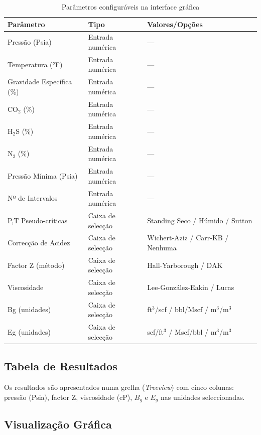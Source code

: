 \documentclass[12pt, a4paper]{article}
\begin{document}
\begin{table}[H]
  \centering
  \caption{Parâmetros configuráveis na interface gráfica}
  \begin{tabular}{@{}lll@{}}
    \toprule
    \textbf{Parâmetro} & \textbf{Tipo} & \textbf{Valores/Opções} \\
    \midrule
    Pressão (Psia)        & Entrada numérica  & — \\
    Temperatura (°F)      & Entrada numérica  & — \\
    Gravidade Específica (\%) & Entrada numérica & — \\
    CO$_2$ (\%)           & Entrada numérica  & — \\
    H$_2$S (\%)           & Entrada numérica  & — \\
    N$_2$ (\%)            & Entrada numérica  & — \\
    Pressão Mínima (Psia) & Entrada numérica  & — \\
    Nº de Intervalos      & Entrada numérica  & — \\
    P,T Pseudo-críticas   & Caixa de selecção & Standing Seco / Húmido / Sutton \\
    Correcção de Acidez   & Caixa de selecção & Wichert-Aziz / Carr-KB / Nenhuma \\
    Factor Z (método)     & Caixa de selecção & Hall-Yarborough / DAK \\
    Viscosidade           & Caixa de selecção & Lee-González-Eakin / Lucas \\
    Bg (unidades)         & Caixa de selecção & ft$^3$/scf / bbl/Mscf / m$^3$/m$^3$ \\
    Eg (unidades)         & Caixa de selecção & scf/ft$^3$ / Mscf/bbl / m$^3$/m$^3$ \\
    \bottomrule
  \end{tabular}
\end{table}

\subsection{Tabela de Resultados}

Os resultados são apresentados numa grelha (\textit{Treeview}) com cinco colunas:
pressão (Psia), factor Z, viscosidade (cP), $B_g$ e $E_g$ nas unidades seleccionadas.

\subsection{Visualização Gráfica}
\end{document}
